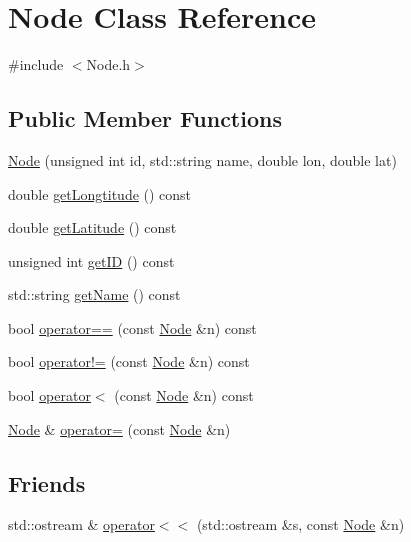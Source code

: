 \hypertarget{classNode}{\section{Node Class Reference}
\label{classNode}
}


{\ttfamily \#include $<$Node.\+h$>$}

\subsection*{Public Member Functions}
\begin{DoxyCompactItemize}
\item 
\hyperlink{classNode_a26d0fb21cd7b8a36d3a9fe6b03364805}{Node} (unsigned int id, std\+::string name, double lon, double lat)
\item 
double \hyperlink{classNode_a2d807aea32b63bcdd55366531ea799dd}{get\+Longtitude} () const 
\item 
double \hyperlink{classNode_a6b36253a7932a08ff860b6af0a3fefc8}{get\+Latitude} () const 
\item 
unsigned int \hyperlink{classNode_ab1b048803bc356869d43f1d75b606224}{get\+I\+D} () const 
\item 
std\+::string \hyperlink{classNode_ac0e1bf66136011341971a9bd96dbb77a}{get\+Name} () const 
\item 
bool \hyperlink{classNode_a34785dbb41a8eed1a1871863300ab180}{operator==} (const \hyperlink{classNode}{Node} \&n) const 
\item 
bool \hyperlink{classNode_a8a832520a1ae218d9ccbd4eb7bf33311}{operator!=} (const \hyperlink{classNode}{Node} \&n) const 
\item 
bool \hyperlink{classNode_ae5e8b9a799349c9d2c1ae2a3f4c57b3d}{operator$<$} (const \hyperlink{classNode}{Node} \&n) const 
\item 
\hyperlink{classNode}{Node} \& \hyperlink{classNode_ae44847806dfcc34d48577354c90de3d9}{operator=} (const \hyperlink{classNode}{Node} \&n)
\end{DoxyCompactItemize}
\subsection*{Friends}
\begin{DoxyCompactItemize}
\item 
std\+::ostream \& \hyperlink{classNode_a41712542bf272d05dac7886e87ab6943}{operator$<$$<$} (std\+::ostream \&s, const \hyperlink{classNode}{Node} \&n)
\end{DoxyCompactItemize}


